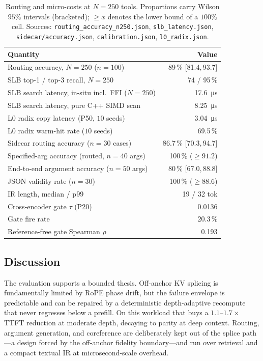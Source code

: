 \documentclass[10pt,conference]{IEEEtran}
\newcommand{\code}[1]{\texttt{\small #1}}
\begin{document}
\begin{table}[t]
\centering
\caption{Routing and micro-costs at $N{=}250$ tools. Proportions carry Wilson $95\%$ intervals
(bracketed); ${\ge}x$ denotes the lower bound of a $100\%$ cell. Sources:
\code{routing\_accuracy\_n250.json}, \code{slb\_latency.json}, \code{sidecar/accuracy.json},
\code{calibration.json}, \code{l0\_radix.json}.}
\label{tab:micro}
\footnotesize
\setlength{\tabcolsep}{3pt}
\begin{tabular}{lr}
\toprule
Quantity & Value \\
\midrule
Routing accuracy, $N{=}250$ ($n{=}100$)      & 89\,\% {\scriptsize[81.4,\,93.7]} \\
SLB top-1 / top-3 recall, $N{=}250$          & 74 / 95\,\% \\
SLB search latency, in-situ incl.\ FFI ($N{=}250$) & \SI{17.6}{\micro\second} \\
SLB search latency, pure C++ SIMD scan       & \SI{8.25}{\micro\second} \\
L0 radix copy latency (P50, $10$ seeds)      & \SI{3.04}{\micro\second} \\
L0 radix warm-hit rate ($10$ seeds)          & 69.5\,\% \\
Sidecar routing accuracy ($n{=}30$ cases)    & 86.7\,\% {\scriptsize[70.3,\,94.7]} \\
Specified-arg accuracy (routed, $n{=}40$ args) & 100\,\% {\scriptsize(${\ge}91.2$)} \\
End-to-end argument accuracy ($n{=}50$ args)  & 80\,\% {\scriptsize[67.0,\,88.8]} \\
JSON validity rate ($n{=}30$)                & 100\,\% {\scriptsize(${\ge}88.6$)} \\
IR length, median / p99                      & 19 / 32 tok \\
Cross-encoder gate $\tau$ (P20)              & 0.0136 \\
Gate fire rate                               & 20.3\,\% \\
Reference-free gate Spearman $\rho$          & 0.193 \\
\bottomrule
\end{tabular}
\end{table}

\subsection{Discussion}
The evaluation supports a bounded thesis. Off-anchor KV splicing is fundamentally limited by RoPE
phase drift, but the failure envelope is predictable and can be repaired by a deterministic
depth-adaptive recompute that never regresses below a prefill. On this workload that buys a
$1.1$--$1.7\times$ TTFT reduction at moderate depth, decaying to parity at deep context. Routing,
argument generation, and coreference are deliberately kept out of the splice path---a design forced
by the off-anchor fidelity boundary---and run over retrieval and a compact textual IR at
microsecond-scale overhead.
\end{document}
